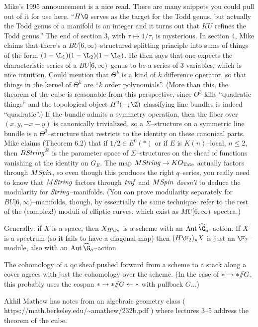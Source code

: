 \documentclass[12pt]{book}
\begin{document}
Mike's 1995 announcement is a nice read. There are many snippets you could pull out of it for use here. ``$H\Q$ serves as the target for the Todd genus, but actually the Todd genus of a manifold is an integer and it turns out that $KU$ refines the Todd genus.''  The end of section 3, with $\tau \mapsto 1/\tau$, is mysterious.  In section 4, Mike claims that there's a $BU[6, \infty)$--structured splitting principle into sums of things of the form $(1 - \L_1)(1 - \L_2)(1 - \L_3)$.  He then says that one expects the characteristic series of a $BU[6, \infty)$--genus to be a series of $3$ variables, which is nice intuition.  Could mention that $\Theta^k$ is a kind of $k${\th} difference operator, so that things in the kernel of $\Theta^k$ are ``$k${\th} order polynomials''.  (More than this, the theorem of the cube is reasonable from this perspective, since $\Theta^3$ kills ``quadratic things'' and the topological object $H^2(-; \Z)$ classifying line bundles is indeed ``quadratic''.)  If the bundle admits a symmetry operation, then the fiber over $(x, y, -x-y)$ is canonically trivialized, so a $\Sigma$--structure on a symmetric line bundle is a $\Theta^3$--structure that restricts to the identity on these canonical parts.  Mike claims (Theorem 6.2) that if $1/2 \in E^0(*)$ or if $E$ is $K(n)$--local, $n \le 2$, then $B\mathit{String}^E$ is the parameter space of $\Sigma$--structures on the sheaf of functions vanishing at the identity on $G_E$.  The map $M\mathit{String} \to KO_{\mathrm{Tate}}$ actually factors through $M\mathit{Spin}$, so even though this produces the right $q$--series, you really need to know that $M\mathit{String}$ factors through $\mathit{tmf}$ and $M\mathit{Spin}$ \emph{doesn't} to deduce the modularity for $\mathit{String}$--manifolds.  (You can prove modularity separately for $BU[6, \infty)$--manifolds, though, by essentially the same technique: refer to the rest of the (complex!) moduli of elliptic curves, which exist as $MU[6, \infty)$--spectra.)

Generally: if $X$ is a space, then $X_{H\F_2}$ is a scheme with an $\Aut \widehat \G_a$--action. If $X$ is a spectrum (so it fails to have a diagonal map) then $(H\F_2)_* X$ is just an $\F_2$--module, also with an $\Aut \widehat \G_a$--action.

The cohomology of a qc sheaf pushed forward from a scheme to a stack along a cover agrees with just the cohomology over the scheme. (In the case of $* \to * /\!\!/ G$, this probably uses the cospan $* \to * /\!\!/ G \leftarrow *$ with pullback $G$...)

Akhil Mathew has notes from an algebraic geometry class ( https://math.berkeley.edu/{\textasciitilde}amathew/232b.pdf ) where lectures 3--5 address the theorem of the cube.
\end{document}
